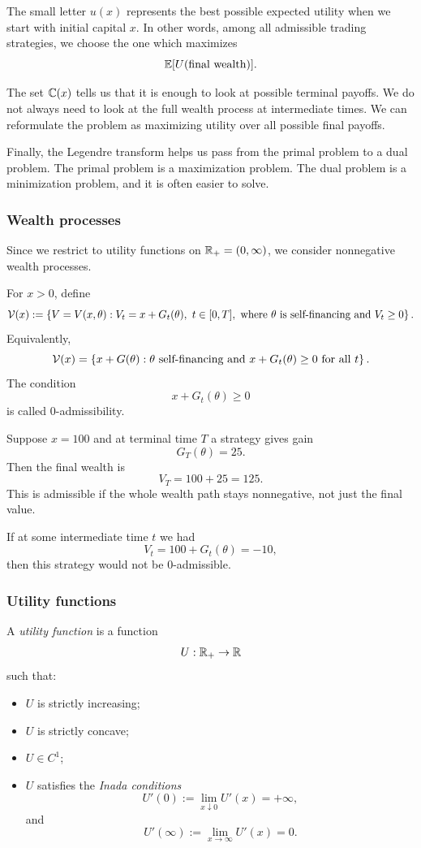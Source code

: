 The small letter $u(x)$ represents the best possible expected utility when we start with initial capital $x$. In other words, among all admissible trading strategies, we choose the one which maximizes
\[
    \mathbb{E}[U(\text{final wealth})].
\]

The set $\mathbb{C}(x)$ tells us that it is enough to look at possible terminal payoffs. We do not always need to look at the full wealth process at intermediate times. We can reformulate the problem as maximizing utility over all possible final payoffs.

Finally, the Legendre transform helps us pass from the primal problem to a dual problem. The primal problem is a maximization problem. The dual problem is a minimization problem, and it is often easier to solve.

\subsubsection*{Wealth processes}

Since we restrict to utility functions on $\mathbb{R}_+=(0,\infty)$, we consider nonnegative wealth processes.

\begin{definicija}
For $x>0$, define
\[
    \mathcal{V}(x)
    :=
    \left\{
        V=V(x,\theta): V_t=x+G_t(\theta),\ t\in[0,T],
        \text{ where } \theta \text{ is self-financing and } V_t\geq 0
    \right\}.
\]
Equivalently,
\[
    \mathcal{V}(x)
    =
    \left\{
        x+G(\theta): \theta \text{ self-financing and } x+G_t(\theta)\geq 0
        \text{ for all } t
    \right\}.
\]
The condition
\[
    x+G_t(\theta)\geq 0
\]
is called $0$-admissibility.
\end{definicija}

\begin{primer}
Suppose $x=100$ and at terminal time $T$ a strategy gives gain
\[
    G_T(\theta)=25.
\]
Then the final wealth is
\[
    V_T=100+25=125.
\]
This is admissible if the whole wealth path stays nonnegative, not just the final value.

If at some intermediate time $t$ we had
\[
    V_t=100+G_t(\theta)=-10,
\]
then this strategy would not be $0$-admissible.
\end{primer}

\subsubsection*{Utility functions}

\begin{definicija}
A \textit{utility function} is a function
\[
    U:\mathbb{R}_+ \to \mathbb{R}
\]
such that:
\begin{itemize}
    \item $U$ is strictly increasing;
    \item $U$ is strictly concave;
    \item $U\in C^1$;
    \item $U$ satisfies the \textit{Inada conditions}
    \[
        U'(0):=\lim_{x\downarrow 0} U'(x)=+\infty,
    \]
    and
    \[
        U'(\infty):=\lim_{x\to\infty} U'(x)=0.
    \]
\end{itemize}
\end{definicija}

